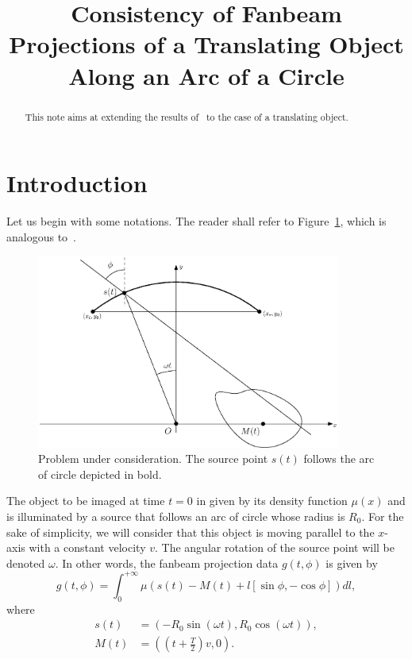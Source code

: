 \documentclass[a4paper]{article}
\title{Consistency of Fanbeam Projections of a Translating Object Along an Arc of a Circle}
\author{}
\date{}
\numberwithin{equation}{section}
\begin{document}
\maketitle

\begin{abstract}
This note aims at extending the results of~\cite{clackdoyle2015consistency} to the case of a translating object.
\end{abstract}

\section{Introduction}

Let us begin with some notations. The reader shall refer to Figure~\ref{fig:notations}, which is analogous to~\cite[Figure~2]{clackdoyle2015consistency}.
\begin{figure}[!ht]
	\centering
	\includegraphics[width=10cm]{frame_scanner.eps}
	\caption{Problem under consideration. The source point $s(t)$ follows the arc of circle depicted in bold.\label{fig:notations}}
\end{figure}
The object to be imaged at time $t=0$ in given by its density function $\mu(x)$ and is illuminated by a source that follows an arc of circle whose radius is $R_0$. For the sake of simplicity, we will consider that this object is moving parallel to the $x$-axis with a constant velocity $v$. The angular rotation of the source point will be denoted $\omega$. In other words, the fanbeam projection data $g(t,\phi)$ is given by
\begin{equation}
	g(t,\phi) = \int_0^{+\infty} \mu \left( s(t) - M(t) + l \left[ \sin \phi, -\cos \phi \right] \right) dl,
\end{equation}
where
\begin{align}
s(t) & = \left( -R_0 \sin(\omega t), R_0 \cos(\omega t) \right), \\
M(t) & =  \left( \left( t + \frac{T}{2} \right)v, 0 \right).
\end{align}
\end{document}
